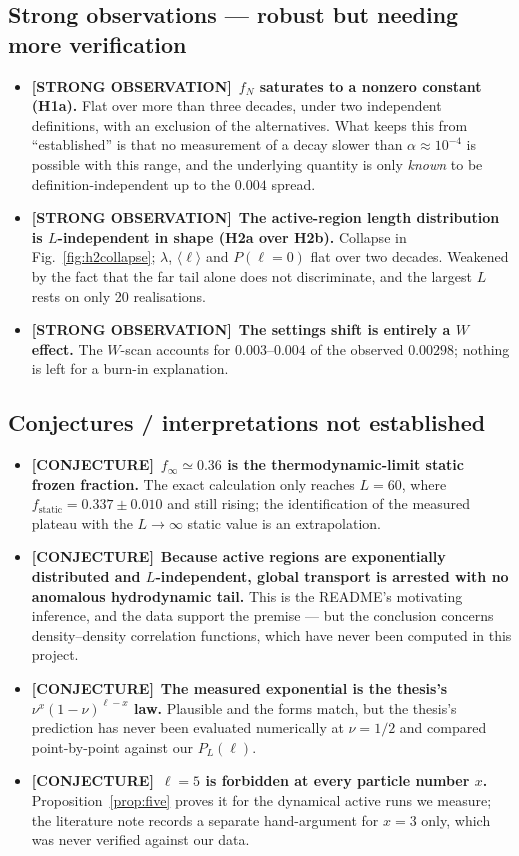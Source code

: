 \documentclass[11pt,a4paper]{article}
\newcommand{\Obs}{\textcolor{obsv}{\textbf{[STRONG OBSERVATION]}}}
\newcommand{\Conj}{\textcolor{conj}{\textbf{[CONJECTURE]}}}
\begin{document}
\subsection*{Strong observations --- robust but needing more verification}
\begin{itemize}
\item \Obs\ \textbf{$f_N$ saturates to a nonzero constant (H1a).} Flat over
more than three decades, under two independent definitions, with an
exclusion of the alternatives. What keeps this from ``established'' is that
no measurement of a decay slower than $\alpha\approx10^{-4}$ is possible
with this range, and the underlying quantity is only \emph{known} to be
definition-independent up to the $0.004$ spread.
\item \Obs\ \textbf{The active-region length distribution is $L$-independent
in shape (H2a over H2b).} Collapse in Fig.~\ref{fig:h2collapse}; $\lambda$,
$\langle\ell\rangle$ and $P(\ell{=}0)$ flat over two decades. Weakened by
the fact that the far tail alone does not discriminate, and the largest $L$
rests on only 20 realisations.
\item \Obs\ \textbf{The settings shift is entirely a $W$ effect.} The
$W$-scan accounts for $0.003$--$0.004$ of the observed $0.00298$; nothing is
left for a burn-in explanation.
\end{itemize}

\subsection*{Conjectures / interpretations not established}
\begin{itemize}
\item \Conj\ \textbf{$f_\infty\simeq0.36$ is the thermodynamic-limit static
frozen fraction.} The exact calculation only reaches $L=60$, where
$f_{\text{static}}=0.337\pm0.010$ and still rising; the identification of
the measured plateau with the $L\to\infty$ static value is an extrapolation.
\item \Conj\ \textbf{Because active regions are exponentially distributed
and $L$-independent, global transport is arrested with no anomalous
hydrodynamic tail.} This is the README's motivating inference, and the data
support the premise --- but the conclusion concerns density--density
correlation functions, which have never been computed in this project.
\item \Conj\ \textbf{The measured exponential is the thesis's
$\nu^x(1-\nu)^{\ell-x}$ law.} Plausible and the forms match, but the
thesis's prediction has never been evaluated numerically at $\nu=1/2$ and
compared point-by-point against our $P_L(\ell)$.
\item \Conj\ \textbf{$\ell=5$ is forbidden at every particle number $x$.}
Proposition~\ref{prop:five} proves it for the dynamical active runs we
measure; the literature note records a separate hand-argument for $x=3$
only, which was never verified against our data.
\end{itemize}
\end{document}

